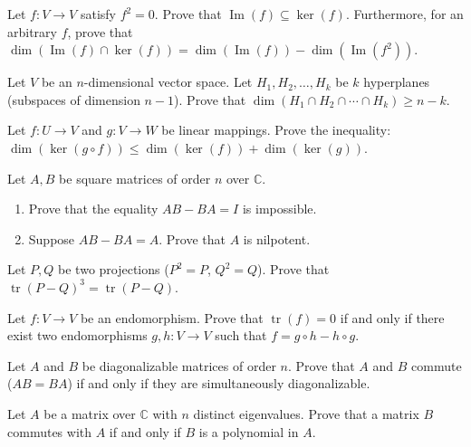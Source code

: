 \documentclass[12pt]{article}
\begin{document}
\begin{problem}
Let $f:V\to V$ satisfy $f^2=0$. Prove that $\operatorname{Im}(f)\subseteq \ker(f)$. Furthermore, for an arbitrary $f$, prove that $\dim(\operatorname{Im}(f)\cap \ker(f)) = \dim(\operatorname{Im}(f))-\dim(\operatorname{Im}(f^2))$.
\end{problem}

\begin{problem}
Let $V$ be an $n$-dimensional vector space. Let $H_1,H_2,\dots,H_k$ be $k$ hyperplanes (subspaces of dimension $n-1$). Prove that $\dim(H_1\cap H_2\cap\cdots\cap H_k) \ge n-k$.
\end{problem}

\begin{problem}
Let $f:U\to V$ and $g:V\to W$ be linear mappings. Prove the inequality: $\dim(\ker(g\circ f)) \le \dim(\ker(f))+\dim(\ker(g))$.
\end{problem}

\begin{problem}
Let $A,B$ be square matrices of order $n$ over $\mathbb{C}$.
\begin{enumerate}[label=(\alph*)]
\item Prove that the equality $AB-BA=I$ is impossible.
\item Suppose $AB-BA=A$. Prove that $A$ is nilpotent.
\end{enumerate}
\end{problem}

\begin{problem}
Let $P,Q$ be two projections ($P^2=P$, $Q^2=Q$). Prove that $\operatorname{tr}(P-Q)^3=\operatorname{tr}(P-Q)$.
\end{problem}

\begin{problem}
Let $f:V\to V$ be an endomorphism. Prove that $\operatorname{tr}(f)=0$ if and only if there exist two endomorphisms $g,h:V\to V$ such that $f=g\circ h - h\circ g$.
\end{problem}

\begin{problem}
Let $A$ and $B$ be diagonalizable matrices of order $n$. Prove that $A$ and $B$ commute ($AB=BA$) if and only if they are simultaneously diagonalizable.
\end{problem}

\begin{problem}
Let $A$ be a matrix over $\mathbb{C}$ with $n$ distinct eigenvalues. Prove that a matrix $B$ commutes with $A$ if and only if $B$ is a polynomial in $A$.
\end{problem}
\end{document}
